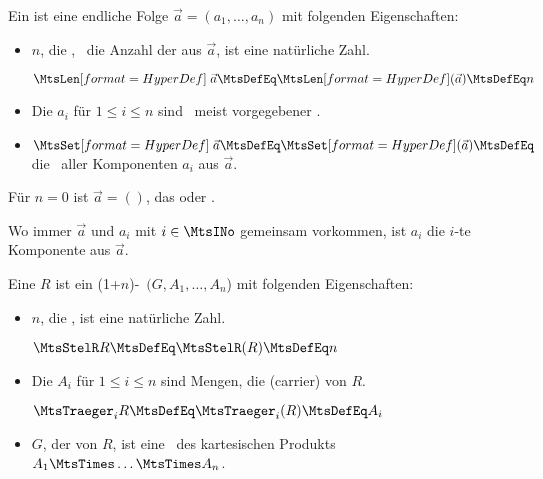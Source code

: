 \begin{description}

	\item[\Folge] %

	\item [\Tupel] Ein  ist eine endliche Folge $\vec{a} = (a_1, \dots, a_n)$ mit folgenden Eigenschaften:
	\begin{itemize}
		\item $n$, die , \textdh\ die Anzahl der  aus $\vec{a}$, ist eine natürliche Zahl.

		$\defSymUna{\MtsLen} \vec{a} \MtsDefEq \defSym{\MtsLen}(\vec{a}) \MtsDefEq n$
		\item Die $a_i$ für $1 \le i \le n$ sind \Elemente\ meist vorgegebener \Mengen.
		\item $\defSymUna{\MtsSet} \vec{a} \MtsDefEq \defSym{\MtsSet}(\vec{a}) \MtsDefEq$ die \Menge\ aller Komponenten $a_i$ aus $\vec{a}$.
	\end{itemize}
	Für $n=0$ ist $\vec{a} = ()$, das  oder .

	Wo immer $\vec{a}$ und $a_i$ mit $i \in \MtsINo$ gemeinsam vorkommen, ist $a_i$ die $i$-te Komponente aus $\vec{a}$.

	\item [\Relation] Eine  $R$ ist ein (1+$n$)-\Tupel\ $(G,A_1,\dots,A_n$) mit folgenden Eigenschaften:
	\begin{itemize}
		\item $n$, die , ist eine natürliche Zahl.

		$\MtsStelR R \MtsDefEq \MtsStelR(R) \MtsDefEq n$
		\item Die $A_i$ für $1 \le i \le n$ sind Mengen, die  (carrier) von $R$.

		$\MtsTraeger_i R \MtsDefEq \MtsTraeger_i(R) \MtsDefEq A_i$
		\item $G$, der  von $R$, ist eine \Teilmenge\ des kartesischen Produkts $A_1 \MtsTimes \dots \MtsTimes A_n$.


\end{itemize}
\end{description}
